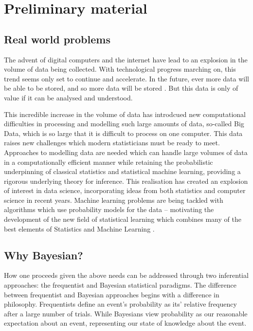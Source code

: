 \chapter{Preliminary material}

\section{Real world problems}
The advent of digital computers and the internet have lead to an explosion in the volume of data being
collected. With technological progress marching on, this trend seems only set to continue and accelerate. In
the future, ever more data will be able to be stored, and so more data will be stored \citep{Gandomi2015}. But
this data is only of value if it can be analysed and understood.

This incredible increase in the volume of data has introdcued new computational difficulties in processing and
modelling such large amounts of data, so-called Big Data, which is so large that it is difficult to process on
one computer. This data raises new challenges which modern statisticians must be ready to meet. Approaches to
modelling data are needed which can handle large volumes of data in a computationally efficient manner while
retaining the probabilistic underpinning of classical statistics and statistical machine learning, providing a
rigorous underlying theory for inference. This realisation has created an explosion of interest in data
science, incorporating ideas from both statistics and computer science in recent years. Machine learning
problems are being tackled with algorithms which use probability models for the data -- motivating the
development of the new field of statistical learning which combines many of the best elements of Statistics
and Machine Learning \citep{James:2014:ISL:2517747, MacKay:2002:ITI:971143, hastie01statisticallearning,
Murphy:2012:MLP:2380985}.

\section{Why Bayesian?}
How one proceeds given the above needs can be addressed through two inferential approaches: the frequentist
and Bayesian statistical paradigms. The difference between frequentist and Bayesian approaches begins with a
difference in philosophy. Frequentists define an event's probability as its' relative frequency after a large
number of trials. While Bayesians view probability as our reasonable expectation about an event, representing
our state of knowledge about the event.


